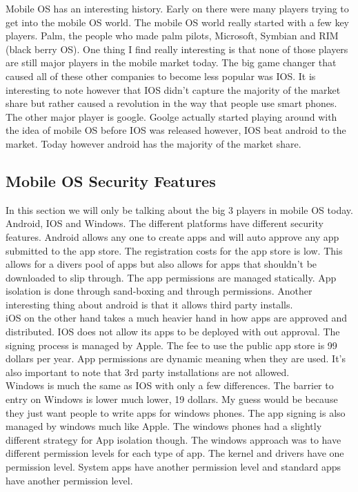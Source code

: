\documentclass[letterpaper, onecolumn,10pt]{IEEEtran}
\begin{document}
		     Mobile OS has an interesting history. Early on there were many players trying to get into the mobile OS world. The mobile OS world really started with a few key players. Palm, the people who made palm pilots, Microsoft, Symbian and RIM (black berry OS). One thing I find really interesting is that none of those players are still major players in the mobile market today. The big game changer that caused all of these other companies to become less popular was IOS. It is interesting to note however that IOS didn't capture the majority of the market share but rather caused a revolution in the way that people use smart phones. The other major player is google. Goolge actually started playing around with the idea of mobile OS before IOS was released however, IOS beat android to the market. Today however android has the majority of the market share.\\
		     
		     \subsection{Mobile OS Security Features}
		     In this section we will only be talking about the big 3 players in mobile OS today. Android, IOS and Windows. The different platforms have different security features. Android allows any one to create apps and will auto approve any app submitted to the app store. The registration costs for the app store is low. This allows for a divers pool of apps but also allows for apps that shouldn't be downloaded to slip through. The app permissions are managed statically. App isolation is done through sand-boxing and through permissions. Another interesting thing about android is that it allows third party installs.\\
		     
		     iOS on the other hand takes a much heavier hand in how apps are approved and distributed. IOS does not allow its apps to be deployed with out approval. The signing process is managed by Apple. The fee to use the public app store is 99 dollars per year. App permissions are dynamic meaning when they are used. It's also important to note that 3rd party installations are not allowed.\\
		     
		     Windows is much the same as IOS with only a few differences. The barrier to entry on Windows is lower much lower, 19 dollars. My guess would be because they just want people to write apps for windows phones. The app signing is also managed by windows much like Apple. The windows phones had a slightly different strategy for App isolation though. The windows approach was to have different permission levels for each type of app. The kernel and drivers have one permission level. System apps have another permission level and standard apps have another permission level.\\
		     
\end{document}
